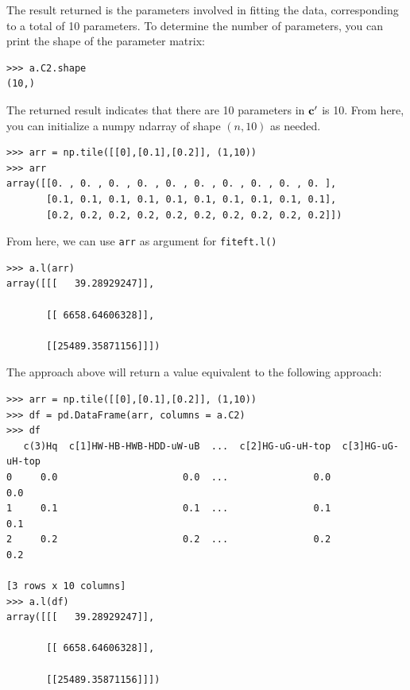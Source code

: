 \documentclass[12pt]{article}
\def\b#1{\boldsymbol{\rm #1}}
\begin{document}
 The result returned is the parameters involved in fitting the data, corresponding to a total of 10 parameters. To determine the number of parameters, you can print the shape of the parameter matrix:
\begin{verbatim}
>>> a.C2.shape
(10,)
   \end{verbatim}
The returned result indicates that there are 10 parameters in $\b c'$ is 10. From here, you can initialize a numpy ndarray of shape $(n, 10)$ as needed.
\begin{verbatim}
>>> arr = np.tile([[0],[0.1],[0.2]], (1,10))
>>> arr
array([[0. , 0. , 0. , 0. , 0. , 0. , 0. , 0. , 0. , 0. ],
       [0.1, 0.1, 0.1, 0.1, 0.1, 0.1, 0.1, 0.1, 0.1, 0.1],
       [0.2, 0.2, 0.2, 0.2, 0.2, 0.2, 0.2, 0.2, 0.2, 0.2]])
\end{verbatim}
From here, we can use \verb|arr| as argument for \verb|fiteft.l()|
\begin{verbatim}
>>> a.l(arr)
array([[[   39.28929247]],

       [[ 6658.64606328]],

       [[25489.35871156]]])
\end{verbatim}
The approach above will return a value equivalent to the following approach:
\begin{verbatim}
>>> arr = np.tile([[0],[0.1],[0.2]], (1,10))
>>> df = pd.DataFrame(arr, columns = a.C2)
>>> df
   c(3)Hq  c[1]HW-HB-HWB-HDD-uW-uB  ...  c[2]HG-uG-uH-top  c[3]HG-uG-uH-top
0     0.0                      0.0  ...               0.0               0.0
1     0.1                      0.1  ...               0.1               0.1
2     0.2                      0.2  ...               0.2               0.2

[3 rows x 10 columns]
>>> a.l(df)
array([[[   39.28929247]],

       [[ 6658.64606328]],

       [[25489.35871156]]])
\end{verbatim}
\end{document}
